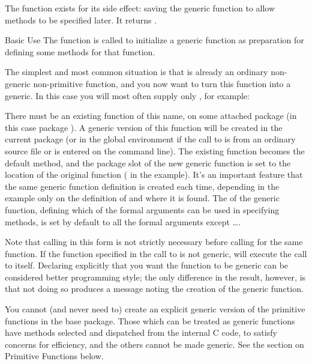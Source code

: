 %
\begin{Value}
The  function exists for its side effect: saving the
generic function to allow methods to be specified later.  It returns
.
\end{Value}
%
\begin{Section}{Basic Use}
The  function is called to initialize a generic
function as preparation for defining some methods for that function.

The simplest and most common situation is that  is already
an ordinary non-generic non-primitive function, and you now want to
turn this function into a generic.  In this case you will most often
supply only , for example:


There must be an existing function of this name, on some attached
package (in this case package ).  A generic version of
this function will be created in the current package (or in the global
environment if the call to  is from an ordinary
source file or is entered on the command line).  The existing function
becomes the default method, and the package slot of the new generic
function is set to the location of the original function
( in the example).  It's an important feature that the
same generic function definition is created each time, depending in
the example only on the definition of  and where it is
found.  The  of the generic function, defining which
of the formal arguments can be used in specifying methods, is set by
default to all the formal arguments except \dots.

Note that calling  in this form is not strictly
necessary before calling  for the same function.  If
the function specified in the call to  is not generic,
 will execute the call to  itself.
Declaring explicitly that you want the function to be generic can be
considered better programming style; the only difference in the
result, however, is that not doing so produces a message noting the
creation of the generic function.

You cannot (and never need to) create an explicit generic version of
the primitive functions in the base package.  Those which can be
treated as generic functions have methods selected and dispatched from
the internal C code, to satisfy concerns for efficiency, and the
others cannot be made generic.  See the section on Primitive Functions
below.


\end{Section}
